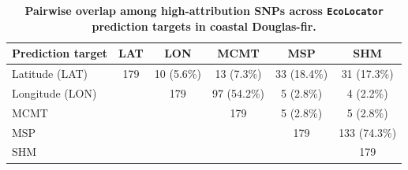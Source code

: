\documentclass[]{article}
\newcommand{\dfir}{Douglas-fir\xspace}
\newcommand{\ecolocator}{\texttt{EcoLocator}\xspace}
\begin{document}
\begin{table}[ht]
  \centering
  \caption{\textbf{Pairwise overlap among high-attribution SNPs across 
  \ecolocator prediction targets in coastal \dfir.}}
  \label{tab:dfir-shap-overlap}
  \begin{tabular}{@{}lccccc@{}}
  \hline
  \textbf{Prediction target} & \textbf{LAT} & \textbf{LON} & \textbf{MCMT} & \textbf{MSP} & \textbf{SHM} \\
  \hline
  Latitude (LAT)  & 179 & 10 (5.6\%) & 13 (7.3\%) & 33 (18.4\%) & 31 (17.3\%) \\
  Longitude (LON) &     & 179        & 97 (54.2\%) & 5 (2.8\%) & 4 (2.2\%) \\
  MCMT            &     &            & 179         & 5 (2.8\%) & 5 (2.8\%) \\
  MSP             &     &            &             & 179       & 133 (74.3\%) \\
  SHM             &     &            &             &           & 179 \\
  \hline
  \end{tabular}
\end{table}
\end{document}
